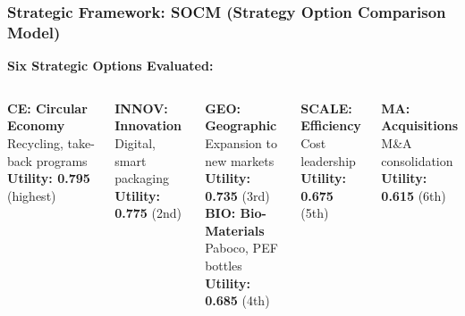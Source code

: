 \documentclass[aspectratio=169,12pt,xcolor=dvipsnames]{beamer}
\newcommand{\highlight}[1]{{\color{alpla_blue}\textbf{#1}}}
\begin{document}

\begin{frame}
  \frametitle{Strategic Framework: SOCM (Strategy Option Comparison Model)}

  \textbf{Six Strategic Options Evaluated:}

  \vspace{0.3cm}

  \begin{columns}[T]
    \centering
    \textbf{\highlight{CE: Circular Economy}} \\
    Recycling, take-back programs \\
    \textbf{Utility: 0.795} (highest) \\

    \vspace{0.3cm}

    \textbf{\highlight{INNOV: Innovation}} \\
    Digital, smart packaging \\
    \textbf{Utility: 0.775} (2nd) \\

    \vspace{0.3cm}

    \textbf{\highlight{GEO: Geographic}} \\
    Expansion to new markets \\
    \textbf{Utility: 0.735} (3rd) \\

    \centering
    \textbf{\highlight{BIO: Bio-Materials}} \\
    Paboco, PEF bottles \\
    \textbf{Utility: 0.685} (4th) \\

    \vspace{0.3cm}

    \textbf{\highlight{SCALE: Efficiency}} \\
    Cost leadership \\
    \textbf{Utility: 0.675} (5th) \\

    \vspace{0.3cm}

    \textbf{\highlight{MA: Acquisitions}} \\
    M\&A consolidation \\
    \textbf{Utility: 0.615} (6th) \\


\end{columns}
\end{frame}
\end{document}
